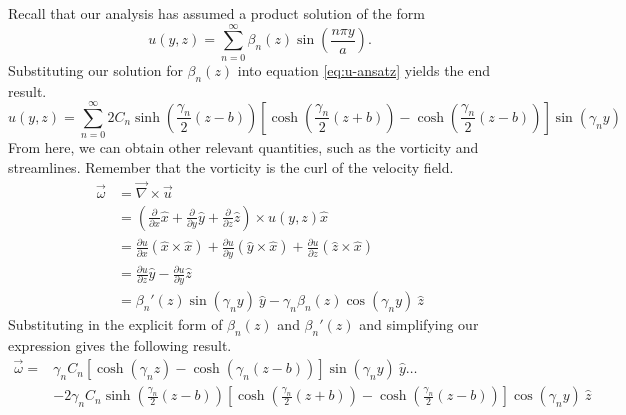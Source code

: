 Recall that our analysis has assumed a product solution of the form 
\begin{equation}
    u(y,z) = \sum_{n=0}^{\infty} \beta_n(z) \sin\left(\frac{n \pi y}{a}\right). 
    \label{eq:u-ansatz}
\end{equation}
Substituting our solution for $\beta_n(z)$ into equation \eqref{eq:u-ansatz} yields the end result.
\begin{equation}
    \boxed{u(y,z) = \sum_{n=0}^{\infty} 2C_n \sinh\left(\frac{\gamma_n}{2}(z-b)\right)\left[\cosh\left(\frac{\gamma_n}{2}(z+b)\right) - \cosh\left(\frac{\gamma_n}{2}(z-b)\right)\right] \sin(\gamma_n y)}
\end{equation}
From here, we can obtain other relevant quantities, such as the vorticity and streamlines. Remember that the vorticity is the curl of the velocity field.
\begin{align}
    \vec{\omega} &= \vec{\nabla}\times\vec{u}\\
    &= \left(\frac{\partial}{\partial x}\hat{x} + \frac{\partial}{\partial y}\hat{y} + \frac{\partial}{\partial z}\hat{z}\right) \times u(y,z)\hat{x}\\
    &= \frac{\partial u}{\partial x} (\hat{x}\times\hat{x}) + \frac{\partial u}{\partial y} (\hat{y}\times\hat{x}) + \frac{\partial u}{\partial z} (\hat{z}\times\hat{x})\\
    &= \frac{\partial u}{\partial z}\hat{y} - \frac{\partial u}{\partial y}\hat{z}\\
    &= \beta_n'(z) \sin(\gamma_n y)\ \hat{y} - \gamma_n \beta_n(z) \cos(\gamma_n y)\ \hat{z}
\end{align}
Substituting in the explicit form of $\beta_n(z)$ and $\beta_n'(z)$ and simplifying our expression gives the following result.
\begin{align}
    \vec{\omega} = &\gamma_n C_n \left[\cosh(\gamma_n z) - \cosh(\gamma_n(z-b))\right]\sin(\gamma_n y)\ \hat{y} \dots\nonumber\\
    &- 2 \gamma_n C_n \sinh\left(\frac{\gamma_n}{2}(z-b)\right)\left[\cosh\left(\frac{\gamma_n}{2}(z+b)\right) - \cosh\left(\frac{\gamma_n}{2}(z-b)\right)\right] \cos(\gamma_n y)\ \hat{z}
\end{align}